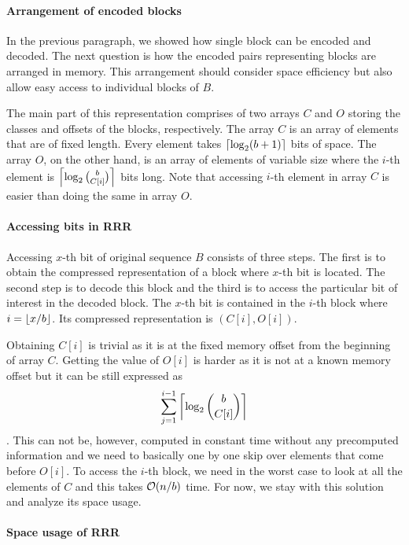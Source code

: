 \paragraph{Arrangement of encoded blocks}

In the previous paragraph, we showed how single block can be encoded and decoded. The next question is how the
encoded pairs representing blocks are arranged in memory. This arrangement should consider space efficiency
but also allow easy access to individual blocks of $B$. 

The main part of this representation comprises of two arrays $C$ and $O$ storing the classes and offsets of
the blocks, respectively. The array $C$ is an array of elements that are of fixed length. Every element takes
$\left\lceil \log_2(b+1) \right\rceil$ bits of space. The array $O$, on the other hand, is an array of elements of variable
size where the $i$-th element is $\left\lceil \log_2{b\choose C[i]} \right\rceil$ bits long. Note that accessing $i$-th element
in array $C$ is easier than doing the same in array $O$.

\paragraph{Accessing bits in RRR}

Accessing $x$-th bit of original sequence $B$ consists of three steps. The first is to obtain the
compressed representation of a block where $x$-th bit is located. The second step is to decode this block and
the third is to access the particular bit of interest in the decoded block. The $x$-th bit is contained in the
$i$-th block where $i=\left\lfloor x/b \right\rfloor$. Its compressed representation is $(C[i], O[i])$.

Obtaining $C[i]$ is trivial as it is at the fixed memory offset from the beginning of array $C$. Getting the
value of $O[i]$ is harder as it is not at a known memory offset but it can be still expressed as
$$\sum_{j=1}^{i-1} \left\lceil \log_2{b\choose C[i]} \right\rceil$$. This can not be, however, computed in constant time without
any precomputed information and we need to basically one by one skip over elements that come before $O[i]$.
To access the $i$-th block, we need in the worst case to look at all the elements of $C$ and this
takes $\mathcal{O}(n/b)$ time. For now, we stay with this solution and analyze its space usage.

\paragraph{Space usage of RRR}

